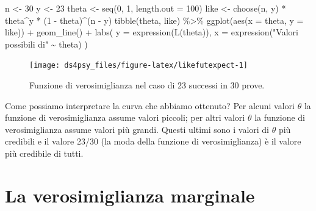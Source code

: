 \documentclass[
  11pt,
]{krantz}
\makeatletter
\newenvironment{Shaded}{\begin{snugshade}}{\end{snugshade}}
\newcommand{\AttributeTok}[1]{\textcolor[rgb]{0.61,0.61,0.61}{#1}}
\newcommand{\DecValTok}[1]{\textcolor[rgb]{0.06,0.06,0.06}{#1}}
\newcommand{\FunctionTok}[1]{\textcolor[rgb]{0,0,0}{#1}}
\newcommand{\NormalTok}[1]{#1}
\newcommand{\OtherTok}[1]{\textcolor[rgb]{0.37,0.37,0.37}{#1}}
\newcommand{\SpecialCharTok}[1]{\textcolor[rgb]{0,0,0}{#1}}
\newcommand{\StringTok}[1]{\textcolor[rgb]{0.5,0.5,0.5}{#1}}
\newenvironment{kframe}{%
\medskip{}
\setlength{\fboxsep}{.8em}
 \def\at@end@of@kframe{}%
 \ifinner\ifhmode%
  \def\at@end@of@kframe{\end{minipage}}%
  \begin{minipage}{\columnwidth}%
 \fi\fi%
 \def\FrameCommand##1{\hskip\@totalleftmargin \hskip-\fboxsep
 \colorbox{shadecolor}{##1}\hskip-\fboxsep
     \hskip-\linewidth \hskip-\@totalleftmargin \hskip\columnwidth}%
 \MakeFramed {\advance\hsize-\width
   \@totalleftmargin\z@ \linewidth\hsize
   \@setminipage}}%
 {\par\unskip\endMakeFramed%
 \at@end@of@kframe}
\renewenvironment{Shaded}{\begin{kframe}}{\end{kframe}}
\theoremstyle{definition}
\theoremstyle{definition}
\theoremstyle{definition}
\theoremstyle{definition}
\theoremstyle{remark}
\makeatother
\begin{document}
\begin{Shaded}
\begin{Highlighting}[]
\NormalTok{n }\OtherTok{\textless{}{-}} \DecValTok{30}
\NormalTok{y }\OtherTok{\textless{}{-}} \DecValTok{23}
\NormalTok{theta }\OtherTok{\textless{}{-}} \FunctionTok{seq}\NormalTok{(}\DecValTok{0}\NormalTok{, }\DecValTok{1}\NormalTok{, }\AttributeTok{length.out =} \DecValTok{100}\NormalTok{)}
\NormalTok{like }\OtherTok{\textless{}{-}} \FunctionTok{choose}\NormalTok{(n, y) }\SpecialCharTok{*}\NormalTok{ theta}\SpecialCharTok{\^{}}\NormalTok{y }\SpecialCharTok{*}\NormalTok{ (}\DecValTok{1} \SpecialCharTok{{-}}\NormalTok{ theta)}\SpecialCharTok{\^{}}\NormalTok{(n }\SpecialCharTok{{-}}\NormalTok{ y)}
\FunctionTok{tibble}\NormalTok{(theta, like) }\SpecialCharTok{\%\textgreater{}\%}
  \FunctionTok{ggplot}\NormalTok{(}\FunctionTok{aes}\NormalTok{(}\AttributeTok{x =}\NormalTok{ theta, }\AttributeTok{y =}\NormalTok{ like)) }\SpecialCharTok{+}
  \FunctionTok{geom\_line}\NormalTok{() }\SpecialCharTok{+}
  \FunctionTok{labs}\NormalTok{(}
    \AttributeTok{y =} \FunctionTok{expression}\NormalTok{(}\FunctionTok{L}\NormalTok{(theta)),}
    \AttributeTok{x =} \FunctionTok{expression}\NormalTok{(}\StringTok{"Valori possibili di"} \SpecialCharTok{\textasciitilde{}}\NormalTok{ theta)}
\NormalTok{  )}
\end{Highlighting}
\end{Shaded}

\begin{figure}

{\centering \texttt{[image: ds4psy\_files/figure-latex/likefutexpect-1]} 

}

\caption{Funzione di verosimiglianza nel caso di 23 successi in 30 prove.}\label{fig:likefutexpect}
\end{figure}

Come possiamo interpretare la curva che abbiamo ottenuto? Per alcuni valori \(\theta\) la funzione di verosimiglianza assume valori piccoli; per altri valori \(\theta\) la funzione di verosimiglianza assume valori più grandi. Questi ultimi sono i valori di \(\theta\) più credibili e il valore 23/30 (la moda della funzione di verosimiglianza) è il valore più credibile di tutti.

\hypertarget{sec:const-normaliz-bino23}{%
\section{La verosimiglianza marginale}\label{sec:const-normaliz-bino23}}
\end{document}
